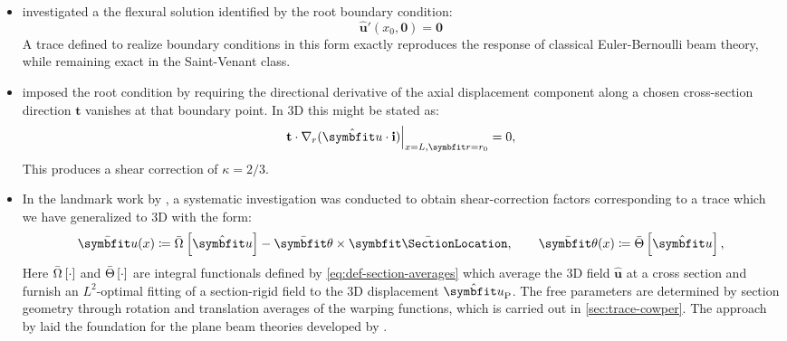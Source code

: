 

\begin{itemize}
    \item \cite{timoshenko1987theory} investigated a the flexural solution identified by the root boundary condition:
    \[
    \hat{\bm u}'(x_0, \mathbf{0}) = \mathbf{0}
    \]
    A trace defined to realize boundary conditions in this form exactly reproduces the response of classical Euler-Bernoulli beam theory, while remaining exact in the Saint-Venant class.

    \item \cite{timoshenko1921correction} imposed the root condition by requiring the directional derivative of the axial displacement component along a chosen cross-section direction \(\mathbf{t}\) vanishes at that boundary point. 
    In 3D this might be stated as:
    $$
    \left.\mathbf{t} \cdot \nabla_r(\hat{\bm u} \cdot \FrameBasis)\right|_{x=L, \bm{r}=r_0}=0,
    $$
    This produces a shear correction of \(\kappa = 2/3\).
    \item In the landmark work by \cite{cowper1966shear}, a systematic investigation was conducted to obtain shear-correction factors corresponding to a trace which we have generalized to 3D with the form:
    \begin{equation}
    \bar{\bm{u}}(x) \coloneq \SectionAverage{\hat{\bm{u}}} - \bar{\bm{\theta}} \times \CentroidLocation, 
    \qquad 
    \bar{\bm{\theta}}(x) \coloneq \RotationAverage{\hat{\bm{u}}},
    \label{eq:def-section-avg-trace}
    \end{equation}
    Here $\bar{\Omega}_{}\left[\cdot\right]$ and $\bar{\Theta}\left[\cdot\right]$ are integral functionals defined by \eqref{eq:def-section-averages} which average the 3D field \(\hat{\bm u}\) at a cross section and furnish an $L^2$-optimal fitting of a section-rigid field to the 3D displacement \(\hat{\bm u}_{\rm P}\). 
    The free parameters are determined by section geometry through rotation and translation averages of the warping functions, which is carried out in \cref{sec:trace-cowper}.
    The approach by \cite{cowper1966shear} laid the foundation for the plane beam theories developed by \cite{simo1982bifurcation,hjelmstad1983seismic,hjelmstad1987warping}. 


\end{itemize}
